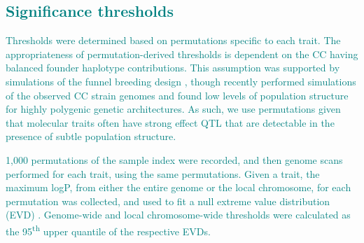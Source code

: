 \documentclass[9pt,twocolumn,twoside]{gsajnl}
\newcommand{\eg}{\emph{e.g.}\xspace}
\newcommand{\GKinline}[1]{\textcolor{teal}{#1}}
\begin{document}

\subsection{\GKinline{Significance thresholds}}

\GKinline{Thresholds were determined based on permutations specific to each trait. The appropriateness of permutation-derived thresholds \citep{Doerge1996} is dependent on the CC having balanced founder haplotype contributions. This assumption was supported by simulations of the funnel breeding design \citep{Valdar2006c}, though recently \cite{KeeleSPARCC} performed simulations of the observed CC strain genomes and found low levels of population structure for highly polygenic genetic architectures. As such, we use permutations given that molecular traits often have strong effect QTL that are detectable in the presence of subtle population structure.}

\GKinline{1,000 permutations of the sample index were recorded, and then genome scans performed for each trait, using the same permutations. Given a trait, the maximum logP, from either the entire genome or the local chromosome, for each permutation was collected, and used to fit a null extreme value distribution (EVD) \citep{Dudbridge2004}. Genome-wide and local chromosome-wide thresholds were calculated as the 95\textsuperscript{th} upper quantile of the respective EVDs.}
\end{document}
